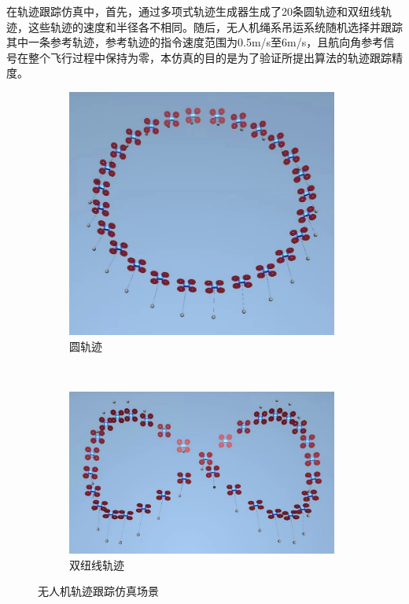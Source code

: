 \documentclass[lang=chs, degree=master, blindreview=true, winfonts=true]{yanputhesis}
\begin{document}
在轨迹跟踪仿真中，首先，通过多项式轨迹生成器生成了20条圆轨迹和双纽线轨迹，这些轨迹的速度和半径各不相同。随后，无人机绳系吊运系统随机选择并跟踪其中一条参考轨迹，参考轨迹的指令速度范围为0.5m/s至6m/s，且航向角参考信号在整个飞行过程中保持为零，本仿真的目的是为了验证所提出算法的轨迹跟踪精度。
\begin{figure}[hbt!]
	\centering
	\begin{subfigure}[t]{0.9\textwidth}
		\centering
		\includegraphics[width=0.98\textwidth]{picture/kk/yuan.jpg}
		\vspace{-0.2cm}
		\caption{圆轨迹}
		\label{yuana}
	\end{subfigure}\\[1.2ex] %
	\begin{subfigure}[t]{0.9\textwidth}
		\centering
		\includegraphics[width=0.98\textwidth]{picture/kk/bazi.jpg}
		\vspace{-0.2cm}
		\caption{双纽线轨迹}
		\label{bazib}
	\end{subfigure}
	\caption{无人机轨迹跟踪仿真场景}
	\label{mujoco}
\end{figure}
\end{document}
